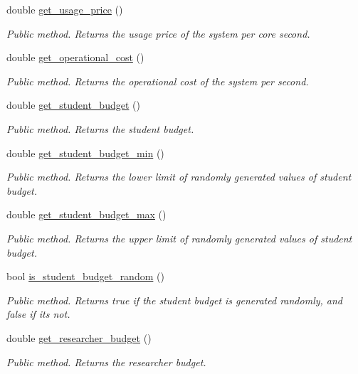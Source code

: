 \begin{DoxyCompactItemize}
double \hyperlink{classConfiguration_a65edb47ed369c917d275812bba3e46c8}{get\+\_\+usage\+\_\+price} ()
\begin{DoxyCompactList}\small\item\em Public method. Returns the usage price of the system per core second. \end{DoxyCompactList}\item 
double \hyperlink{classConfiguration_a3a3d1dd3bb8ef78b09fbed9954ec1c8f}{get\+\_\+operational\+\_\+cost} ()
\begin{DoxyCompactList}\small\item\em Public method. Returns the operational cost of the system per second. \end{DoxyCompactList}\item 
double \hyperlink{classConfiguration_af7b5ce431f51f8848e32ba76af63c531}{get\+\_\+student\+\_\+budget} ()
\begin{DoxyCompactList}\small\item\em Public method. Returns the student budget. \end{DoxyCompactList}\item 
double \hyperlink{classConfiguration_a3a6291edf176db0bdcc4b88c529a6447}{get\+\_\+student\+\_\+budget\+\_\+min} ()
\begin{DoxyCompactList}\small\item\em Public method. Returns the lower limit of randomly generated values of student budget. \end{DoxyCompactList}\item 
double \hyperlink{classConfiguration_a9b8da18d74cdedc6d779c560d714fbc1}{get\+\_\+student\+\_\+budget\+\_\+max} ()
\begin{DoxyCompactList}\small\item\em Public method. Returns the upper limit of randomly generated values of student budget. \end{DoxyCompactList}\item 
bool \hyperlink{classConfiguration_ac5422f301431649bfc63319bf4b0b2e9}{is\+\_\+student\+\_\+budget\+\_\+random} ()
\begin{DoxyCompactList}\small\item\em Public method. Returns true if the student budget is generated randomly, and false if it\textquotesingle{}s not. \end{DoxyCompactList}\item 
double \hyperlink{classConfiguration_a9555ca72e72aacb78585365a328c3c9f}{get\+\_\+researcher\+\_\+budget} ()
\begin{DoxyCompactList}\small\item\em Public method. Returns the researcher budget. \end{DoxyCompactList}\item 

\end{DoxyCompactItemize}
